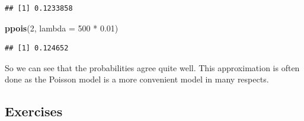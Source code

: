 \documentclass[]{article}
\newenvironment{Shaded}{\begin{snugshade}}{\end{snugshade}}
\newcommand{\KeywordTok}[1]{\textcolor[rgb]{0.13,0.29,0.53}{\textbf{{#1}}}}
\newcommand{\DataTypeTok}[1]{\textcolor[rgb]{0.13,0.29,0.53}{{#1}}}
\newcommand{\DecValTok}[1]{\textcolor[rgb]{0.00,0.00,0.81}{{#1}}}
\newcommand{\FloatTok}[1]{\textcolor[rgb]{0.00,0.00,0.81}{{#1}}}
\newcommand{\StringTok}[1]{\textcolor[rgb]{0.31,0.60,0.02}{{#1}}}
\newcommand{\NormalTok}[1]{{#1}}
\begin{document}
\begin{verbatim}
## [1] 0.1233858
\end{verbatim}

\begin{Shaded}
\begin{Highlighting}[]
\KeywordTok{ppois}\NormalTok{(}\DecValTok{2}\NormalTok{, }\DataTypeTok{lambda =} \DecValTok{500} \NormalTok{*}\StringTok{ }\FloatTok{0.01}\NormalTok{)}
\end{Highlighting}
\end{Shaded}

\begin{verbatim}
## [1] 0.124652
\end{verbatim}

So we can see that the probabilities agree quite well. This
approximation is often done as the Poisson model is a more convenient
model in many respects.

\subsection{Exercises}\label{exercises-5}
\end{document}
